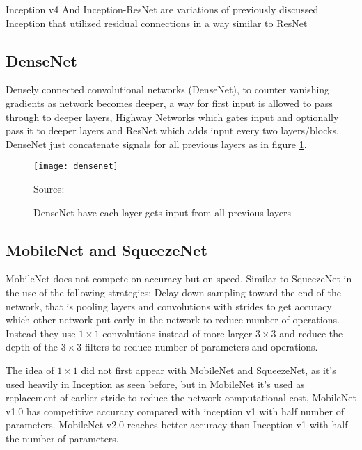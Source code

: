 Inception v4 And Inception-ResNet\autocite{szegedy2017inception} are variations of previously discussed Inception
that utilized residual connections in a way similar to ResNet\autocite{he2016deep}

\subsection{DenseNet}
Densely connected convolutional networks (DenseNet)\autocite{huang2016densely},
to counter vanishing gradients as network becomes deeper,
a way for first input is allowed to pass through to deeper layers,
Highway Networks which gates input and optionally pass it to deeper layers
and ResNet which adds input every two layers/blocks,
DenseNet just concatenate signals for all previous layers as in figure \ref{fig:densenet}.

\begin{figure}[!h]
\centering
\texttt{[image: densenet]}
\caption{DenseNet have each layer gets input from all previous layers}\label{fig:densenet}
{Source: \autocite{huang2016densely}\hfill}
\end{figure}


\subsection{MobileNet and SqueezeNet}

MobileNet\autocite{howard2017mobilenets} does not compete on accuracy but on speed.
Similar to SqueezeNet\autocite{iandola2016squeezenet} in the use of the following strategies\autocite{iandola2016squeezenet}\autocite{he2015convolutional}:
Delay down-sampling toward the end of the network,
that is pooling layers and convolutions with strides to get accuracy
which other network put early in the network to reduce number of operations.
Instead they use \(1\times 1\) convolutions instead of more larger \(3\times 3\) 
and reduce the depth of the \(3 \times 3\) filters to reduce number of parameters and operations.

The idea of \(1\times 1\) did not first appear with MobileNet and SqueezeNet,
as it's used heavily in Inception as seen before,
but in MobileNet it's used as replacement of earlier stride to reduce the network computational cost,
MobileNet v1.0 has competitive accuracy compared with inception v1 with half number of parameters.
MobileNet v2.0\autocite{sandler2018inverted} reaches better accuracy than Inception v1 with half the number of parameters.

